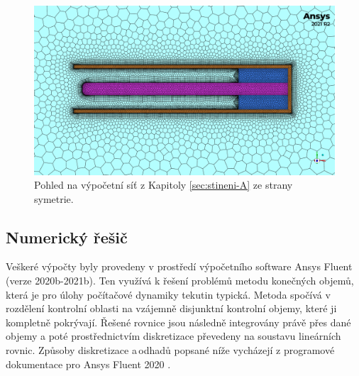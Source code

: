         \begin{figure}
            \centering
            \includegraphics[width=\textwidth]{300_VYPOCETNI_MODEL/mesh_sym_odvetrani_A.png}
            \caption{Pohled na výpočetní síť z Kapitoly \ref{sec:stineni-A} ze strany symetrie.}
            \label{fig:sit-detail-stineni-A}
        \end{figure}
        
    \subsection{Numerický řešič}
        Veškeré výpočty byly provedeny v prostředí výpočetního software Ansys Fluent (verze 2020b-2021b). Ten využívá k řešení problémů metodu konečných objemů, která je pro úlohy počítačové dynamiky tekutin typická. Metoda spočívá v rozdělení kontrolní oblasti na vzájemně disjunktní kontrolní objemy, které ji kompletně pokrývají. Řešené rovnice jsou následně integrovány právě přes dané objemy a poté prostřednictvím diskretizace převedeny na soustavu lineárních rovnic. Způsoby diskretizace a\,odhadů popsané níže vycházejí z programové dokumentace pro Ansys Fluent 2020 \cite{Ansys2020Theory}.

